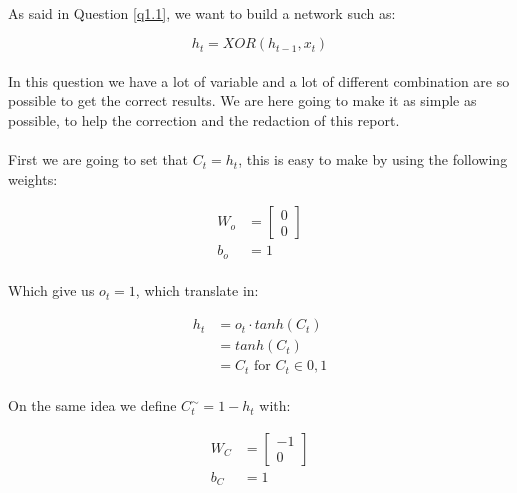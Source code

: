 
\paragraph{}
As said in Question \ref{q1.1}, we want to build a network such as:

\[
    h_t = XOR \left( h_{t-1}, x_t \right)
\]

\paragraph{}
In this question we have a lot of variable and a lot of different combination are so possible to get the correct results.
We are here going to make it as simple as possible, to help the correction and the redaction of this report.

\paragraph{}
First we are going to set that $C_t = h_t$, this is easy to make by using the following weights:

\begin{align*}
    W_o &=
    \begin{bmatrix}
        0 \\
        0
    \end{bmatrix}\\
    b_o &= 1
\end{align*}

\paragraph{}
Which give us $o_t = 1$, which translate in:

\begin{align*}
    h_t &= o_t \cdot tanh(C_t) \\
    &= tanh(C_t) \\
    &= C_t \text{ for } C_t \in {0,1}
\end{align*}

\paragraph{}
On the same idea we define $C^{\sim}_t = 1 - h_t$ with:

\begin{align*}
    W_C &=
    \begin{bmatrix}
        -1 \\
        0
    \end{bmatrix}\\
    b_C &= 1
\end{align*}

